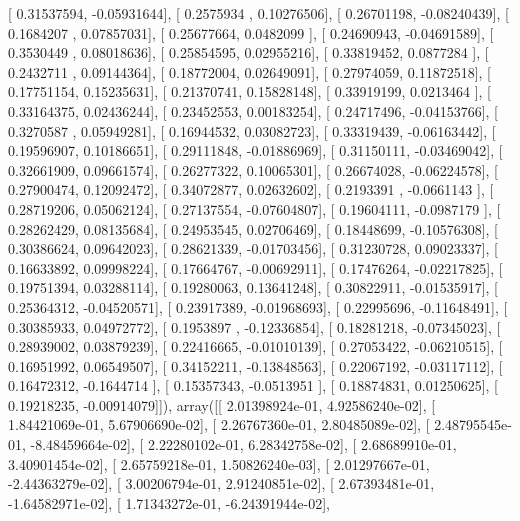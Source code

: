 \documentclass{article}
\begin{document}
       [ 0.31537594, -0.05931644],
       [ 0.2575934 ,  0.10276506],
       [ 0.26701198, -0.08240439],
       [ 0.1684207 ,  0.07857031],
       [ 0.25677664,  0.0482099 ],
       [ 0.24690943, -0.04691589],
       [ 0.3530449 ,  0.08018636],
       [ 0.25854595,  0.02955216],
       [ 0.33819452,  0.0877284 ],
       [ 0.2432711 ,  0.09144364],
       [ 0.18772004,  0.02649091],
       [ 0.27974059,  0.11872518],
       [ 0.17751154,  0.15235631],
       [ 0.21370741,  0.15828148],
       [ 0.33919199,  0.0213464 ],
       [ 0.33164375,  0.02436244],
       [ 0.23452553,  0.00183254],
       [ 0.24717496, -0.04153766],
       [ 0.3270587 ,  0.05949281],
       [ 0.16944532,  0.03082723],
       [ 0.33319439, -0.06163442],
       [ 0.19596907,  0.10186651],
       [ 0.29111848, -0.01886969],
       [ 0.31150111, -0.03469042],
       [ 0.32661909,  0.09661574],
       [ 0.26277322,  0.10065301],
       [ 0.26674028, -0.06224578],
       [ 0.27900474,  0.12092472],
       [ 0.34072877,  0.02632602],
       [ 0.2193391 , -0.0661143 ],
       [ 0.28719206,  0.05062124],
       [ 0.27137554, -0.07604807],
       [ 0.19604111, -0.0987179 ],
       [ 0.28262429,  0.08135684],
       [ 0.24953545,  0.02706469],
       [ 0.18448699, -0.10576308],
       [ 0.30386624,  0.09642023],
       [ 0.28621339, -0.01703456],
       [ 0.31230728,  0.09023337],
       [ 0.16633892,  0.09998224],
       [ 0.17664767, -0.00692911],
       [ 0.17476264, -0.02217825],
       [ 0.19751394,  0.03288114],
       [ 0.19280063,  0.13641248],
       [ 0.30822911, -0.01535917],
       [ 0.25364312, -0.04520571],
       [ 0.23917389, -0.01968693],
       [ 0.22995696, -0.11648491],
       [ 0.30385933,  0.04972772],
       [ 0.1953897 , -0.12336854],
       [ 0.18281218, -0.07345023],
       [ 0.28939002,  0.03879239],
       [ 0.22416665, -0.01010139],
       [ 0.27053422, -0.06210515],
       [ 0.16951992,  0.06549507],
       [ 0.34152211, -0.13848563],
       [ 0.22067192, -0.03117112],
       [ 0.16472312, -0.1644714 ],
       [ 0.15357343, -0.0513951 ],
       [ 0.18874831,  0.01250625],
       [ 0.19218235, -0.00914079]]), array([[  2.01398924e-01,   4.92586240e-02],
       [  1.84421069e-01,   5.67906690e-02],
       [  2.26767360e-01,   2.80485089e-02],
       [  2.48795545e-01,  -8.48459664e-02],
       [  2.22280102e-01,   6.28342758e-02],
       [  2.68689910e-01,   3.40901454e-02],
       [  2.65759218e-01,   1.50826240e-03],
       [  2.01297667e-01,  -2.44363279e-02],
       [  3.00206794e-01,   2.91240851e-02],
       [  2.67393481e-01,  -1.64582971e-02],
       [  1.71343272e-01,  -6.24391944e-02],
\end{document}
